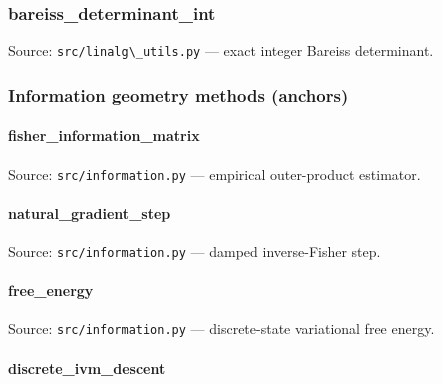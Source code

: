 \documentclass[
  10pt,
]{article}
\newcommand{\passthrough}[1]{#1}
\renewcommand{\texttt}[1]{%
    \colorbox{codebg}{\color{codefg}\ttfamily #1}%
}
\begin{document}
\hypertarget{code:bareiss_determinant_int}{%
\subsubsection{\texorpdfstring{\texttt{bareiss\_determinant\_int}}{bareiss\_determinant\_int}}\label{code:bareiss_determinant_int}}

Source: \passthrough{\lstinline!src/linalg\_utils.py!} --- exact integer
Bareiss determinant.

\hypertarget{information-geometry-methods-anchors}{%
\subsubsection{Information geometry methods
(anchors)}\label{information-geometry-methods-anchors}}

\hypertarget{code:fisher_information_matrix}{%
\paragraph{\texorpdfstring{\texttt{fisher\_information\_matrix}}{fisher\_information\_matrix}}\label{code:fisher_information_matrix}}

Source: \passthrough{\lstinline!src/information.py!} --- empirical
outer-product estimator.

\hypertarget{code:natural_gradient_step}{%
\paragraph{\texorpdfstring{\texttt{natural\_gradient\_step}}{natural\_gradient\_step}}\label{code:natural_gradient_step}}

Source: \passthrough{\lstinline!src/information.py!} --- damped
inverse-Fisher step.

\hypertarget{code:free_energy}{%
\paragraph{\texorpdfstring{\texttt{free\_energy}}{free\_energy}}\label{code:free_energy}}

Source: \passthrough{\lstinline!src/information.py!} --- discrete-state
variational free energy.

\hypertarget{code:discrete_ivm_descent}{%
\paragraph{\texorpdfstring{\texttt{discrete\_ivm\_descent}}{discrete\_ivm\_descent}}\label{code:discrete_ivm_descent}}
\end{document}
